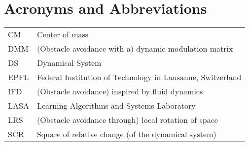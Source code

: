 \section*{Acronyms and Abbreviations} 
\begin{tabular}[h]{L{.2\textwidth} L{.8\textwidth}}
CM 		& Center of mass \\
DMM 		& (Obstacle avoidance with a) dynamic modulation matrix \\
DS 			& Dynamical System \\
EPFL 						&Federal Institution of Technology in Lausanne, Switzerland\\
IFD 		& (Obstacle avoidance) inspired by fluid dynamics \\
LASA 							& Learning Algorithms and Systems Laboratory \\
LRS 		& (Obstacle avoidance through) local rotation of space\\
SCR 		& Square of relative change (of the dynamical system)
	\end{tabular}
			
\clearpage%